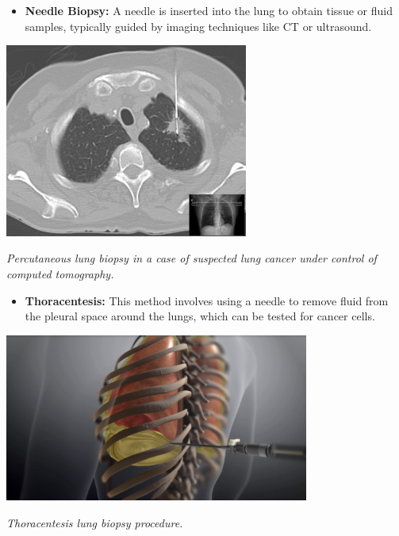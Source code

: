 \begin{itemize}
    \item \textbf{Needle Biopsy:} A needle is inserted into the lung to obtain tissue or fluid 
    samples, typically guided by imaging techniques like CT or ultrasound.
\end{itemize}

\vspace{1em}
\begin{center}
    \includegraphics[width=0.60\textwidth]{../assets/04-diagnosis/lc-needle-biopsy.png}

    \small\textit{Percutaneous lung biopsy in a case of suspected lung cancer under control of 
    computed tomography. \cite{enwiki:1188144138}}
\end{center}
\vspace{1em}

\begin{itemize}
    \item \textbf{Thoracentesis:} This method involves using a needle to remove fluid from the 
    pleural space around the lungs, which can be tested for cancer cells.
\end{itemize}

\vspace{1em}
\begin{center}
    \includegraphics[width=0.75\textwidth]{../assets/04-diagnosis/lc-thoracentesis.jpg}
    
    \small\textit{Thoracentesis lung biopsy procedure. \cite{youtube_QubaJaH_THc}}
\end{center}
\vspace{1em}

